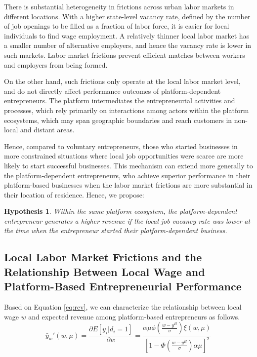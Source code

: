 \documentclass[letterpaper,12pt]{article}
\newtheorem{hypothesis}{Hypothesis}
\begin{document}
There is substantial heterogeneity in frictions across urban labor markets in different locations. With a higher state-level vacancy rate, defined by the number of job openings to be filled as a fraction of labor force, it is easier for local individuals to find wage employment. A relatively thinner local labor market has a smaller number of alternative employers, and hence the vacancy rate is lower in such markets. Labor market frictions prevent efficient matches between workers and employers from being formed.

On the other hand, such frictions only operate at the local labor market level, and do not directly affect performance outcomes of platform-dependent entrepreneurs. The platform intermediates the entrepreneurial activities and processes, which rely primarily on interactions among actors within the platform ecosystems, which may span geographic boundaries and reach customers in non-local and distant areas. 

Hence, compared to voluntary entrepreneurs, those who started businesses in more constrained situations where local job opportunities were scarce are more likely to start successful businesses. This mechanism can extend more generally to the platform-dependent entrepreneurs, who achieve superior performance in their platform-based businesses when the labor market frictions are more substantial in their location of residence. Hence, we propose:
\begin{hypothesis}
Within the same platform ecosystem, the platform-dependent entrepreneur generates a higher revenue if the local job vacancy rate was lower at the time when the entrepreneur started their platform-dependent business.
\end{hypothesis}

\subsection{Local Labor Market Frictions and the Relationship Between Local Wage and Platform-Based Entrepreneurial Performance}

Based on Equation \ref{eq:rev}, we can characterize the relationship between local wage $w$ and expected revenue among platform-based entrepreneurs as follows. 
\begin{equation}
\bar{y}_{w}'(w,\mu) = \frac{\partial E\left[y_{i}\vert d_{i}=1\right]}{\partial w} = \frac{\alpha\mu\phi\left(\frac{w-y^{H}}{\sigma}\right)\xi(w,\mu)}{\left[1-\Phi\left(\frac{w-y^{H}}{\sigma}\right)\alpha\mu\right]^{2}}
\end{equation}
\end{document}
